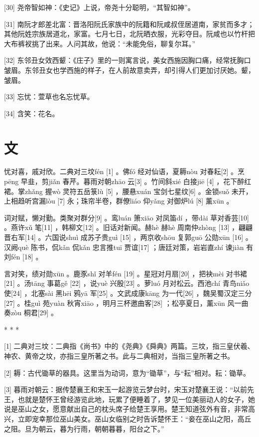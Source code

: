 \documentclass[12pt,UTF8]{ctexbook}
\begin{document}
[30] 尧帝智如神：《史记》上说，帝尧十分聪明，“其智如神”。

[31] 南阮才郎差北富：晋洛阳阮氏家族中的阮籍和阮咸叔侄居道南，家贫而多才；其他阮姓宗族居道北，家富。七月七日，北阮晒衣服，光彩夺目。阮咸也以竹杆把大布裤衩挑了出来。人问其故，他说：“未能免俗，聊复尔耳。”

[32] 东邻丑女效西颦：《庄子》里的一则寓言说，美女西施因胸口痛，经常抚胸口皱眉。东邻丑女也学西施的样子，在人前故意卖弄，却引得人们更加讨厌她。颦，皱眉。

[33] 忘忧：萱草也名忘忧草。

[34] 含笑：花名。





\chapter{文}


忧对喜，戚对欣。二典对三坟fén [1] 。佛fó 经对仙语，夏耨nòu 对春耘[2] 。烹pēng 早韭，剪jiǎn 春芹。暮雨对朝zhāo 云[3] 。竹间斜xié 白接jiē [4] ，花下醉红裙。掌zhǎng 握wò 灵符五岳箓lù [5] ，腰悬xuán 宝剑七星纹[6] 。金锁suǒ 未开，上相趋听宫漏lòu [7] 永；珠帘半卷，群僚liáo 仰yǎng 对御炉lú [8] 薰xūn 。

词对赋，懒对勤。类聚对群分[9] 。鸾luán 箫xiāo 对凤笛dí ，带dài 草对香芸[10] 。燕许xǔ 笔[11] ，韩柳文[12] 。旧话对新闻。赫hè 赫hè 周南仲zhòng [13] ，翩翩晋右军[14] 。六国说shuì 成苏子贵guì [15] ，两京收shōu 复郭guō 公勋xūn [16] 。汉阙què 陈书，侃kǎn 侃kǎn 忠言推tuī 贾谊[17] ；唐廷对策，岩岩直zhí 谏jiàn 有刘fén [18] 。

言对笑，绩对勋xūn 。鹿豕shǐ 对羊fén [19] 。星冠对月扇[20] ，把袂mèi 对书裙[21] 。汤tāng 事葛gě [22] ，说yuè 兴殷[23] 。萝luó 月对松云。西池chí 青鸟niǎo 使[24] ，北塞sài 黑hēi 鸦yā 军[25] 。文武成康kāng 为一代[26] ，魏吴蜀汉定三分[27] 。桂guì 苑yuàn 秋宵xiāo ，明月三杯邀曲客[28] ；松亭夏日，薰xūn 风一曲奏zòu 桐君[29] 。



* * *



[1] 二典对三坟：二典指《尚书》中的《尧典》《舜典》两篇。三坟，指三皇伏羲、神农、黄帝之坟，亦指三皇所著之书。此与二典相对，当指三皇所著之书。

[2] 耨：古代锄草的器具。这里当为动词，意为“锄草”，与“耘”相对。耘：锄草。

[3] 暮雨对朝云：据传楚襄王和宋玉一起游览云梦台时，宋玉对楚襄王说：“以前先王，也就是楚怀王曾经游览此地，玩累了便睡着了，梦见一位美丽动人的女子，她说是巫山之女，愿意献出自己的枕头席子给楚王享用。楚王知道弦外有音，非常高兴，立即宠幸那位巫山美女。巫山女临别之时告诉楚怀王：“妾在巫山之阳，高丘之阻。旦为朝云，暮为行雨，朝朝暮暮，阳台之下。”
\end{document}
